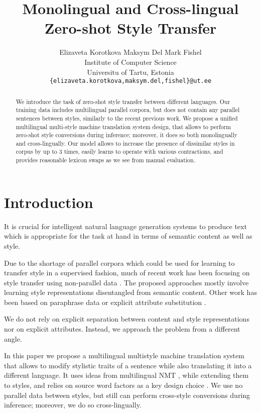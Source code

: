 \documentclass[11pt,a4paper]{article}
\title{Monolingual and Cross-lingual Zero-shot Style Transfer}
\author{Elizaveta Korotkova \hspace{5mm} Maksym Del \hspace{5mm} Mark Fishel \hspace{5mm} \\
  Institute of Computer Science\\
  Universitu of Tartu, Estonia \\
  {\tt \{elizaveta.korotkova,maksym.del,fishel\}@ut.ee}}
\date{}
\begin{document}
\maketitle

\begin{abstract}

We introduce the task of zero-shot style transfer between different languages. Our training data includes multilingual parallel corpora, but does not contain any parallel sentences between styles, similarly to the recent previous work. We propose a unified multilingual multi-style machine translation system design, that allows to perform zero-shot style conversions during inference; moreover, it does so both monolingually and cross-lingually. Our model allows to increase the presence of dissimilar styles in corpus by up to 3 times, easily learns to operate with various contractions, and provides reasonable lexicon swaps as we see from manual evaluation.

\end{abstract}

\section{Introduction}
It is crucial for intelligent natural language generation systems to produce text which is appropriate for the task at hand in terms of semantic content as well as style. %

Due to the shortage of parallel corpora which could be used for learning to transfer style in a supervised fashion, much of recent work has been focusing on style transfer using non-parallel data \cite{mt-backtrans, gvae-2, gvae-3}. The proposed approaches mostly involve learning style representations disentangled from semantic content. Other work has been based on paraphrase data \cite{rnns-zeroshot} or explicit attribute substitution \cite{manual}.

We do not rely on explicit separation between content and style representations nor on explicit attributes. Instead, we approach the problem from a different angle.

In this paper we propose a multilingual multistyle machine translation system that allows to modify stylistic traits of a sentence while also translating it into a different language. It uses ideas from multilingual NMT \cite{multiling-goolge, multiling-multiway}, while extending them to styles, and relies on source word factors as a key design choice \cite{factors}.
We use no parallel data between styles, but still can perform cross-style conversions during inference; moreover, we do so cross-lingually.
\end{document}
